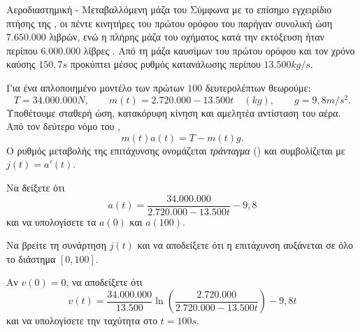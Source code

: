 \begin{problhma}{Αεροδιαστημική - Μεταβαλλόμενη μάζα του }
Σύμφωνα με το επίσημο εγχειρίδιο πτήσης  της , οι
πέντε κινητήρες  του πρώτου ορόφου του  παρήγαν
συνολική ώση $7.650.000$ λιβρών, ενώ η πλήρης μάζα του οχήματος κατά
την εκτόξευση ήταν περίπου $6.000.000$ λίβρες
\cite{nasa1968saturnVManual}. Από τη μάζα καυσίμων του πρώτου ορόφου και
τον χρόνο καύσης $150{,}7\si{s}$ προκύπτει μέσος ρυθμός κατανάλωσης
περίπου $13.500\si{kg/s}$.

Για ένα απλοποιημένο μοντέλο των πρώτων $100$ δευτερολέπτων θεωρούμε:
\[
T=34.000.000\si{N},\qquad
m(t)=2.720.000-13.500t\quad(\si{kg}),\qquad
g=9{,}8\si{m/s^2}.
\]
Υποθέτουμε σταθερή ώση, κατακόρυφη κίνηση και αμελητέα αντίσταση του
αέρα. Από τον δεύτερο νόμο του ,
\[
  m(t)a(t)=T-m(t)g.
\]
Ο ρυθμός μεταβολής της επιτάχυνσης ονομάζεται \emph{τράνταγμα}
() και συμβολίζεται με $j(t)=a'(t)$.

\begin{alist}
\item Να δείξετε ότι
      \[
        a(t)=\frac{34.000.000}
        {2.720.000-13.500t}-9{,}8
      \]
      και να υπολογίσετε τα $a(0)$ και $a(100)$.
\item Να βρείτε τη συνάρτηση $j(t)$ και να αποδείξετε ότι η επιτάχυνση
      αυξάνεται σε όλο το διάστημα $[0,100]$.
\item Αν $v(0)=0$, να αποδείξετε ότι
      \[
        v(t)=\frac{34.000.000}{13.500}
        \ln\left(
        \frac{2.720.000}{2.720.000-13.500t}
        \right)-9{,}8t
      \]
      και να υπολογίσετε την ταχύτητα στο $t=100\si{s}$.
\end{alist}

\begin{center}
\end{center}
\end{problhma}
